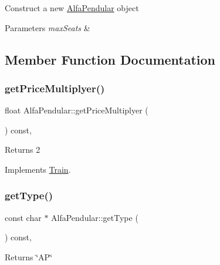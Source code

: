 Construct a new \mbox{\hyperlink{classAlfaPendular}{Alfa\+Pendular}} object


\begin{DoxyParams}{Parameters}
{\em max\+Seats} & \\
\hline
\end{DoxyParams}


\subsection{Member Function Documentation}
\mbox{\label{classAlfaPendular_a12d09e5b65835ab7dcd3580ec8a41eee}} 
\subsubsection{\texorpdfstring{get\+Price\+Multiplyer()}{getPriceMultiplyer()}}
{\footnotesize\ttfamily float Alfa\+Pendular\+::get\+Price\+Multiplyer (\begin{DoxyParamCaption}{ }\end{DoxyParamCaption}) const\hspace{0.3cm}{\ttfamily [override]}, {\ttfamily [virtual]}}

\begin{DoxyReturn}{Returns}
2 
\end{DoxyReturn}


Implements \mbox{\hyperlink{classTrain_a2f8a45aaa96058a2675422d206221964}{Train}}.

\mbox{\label{classAlfaPendular_a8bae5eb768c157fd2151dfb0d0134962}} 
\subsubsection{\texorpdfstring{get\+Type()}{getType()}}
{\footnotesize\ttfamily const char $\ast$ Alfa\+Pendular\+::get\+Type (\begin{DoxyParamCaption}{ }\end{DoxyParamCaption}) const\hspace{0.3cm}{\ttfamily [override]}, {\ttfamily [virtual]}}

\begin{DoxyReturn}{Returns}
\char`\"{}\+A\+P\char`\"{} 
\end{DoxyReturn}


